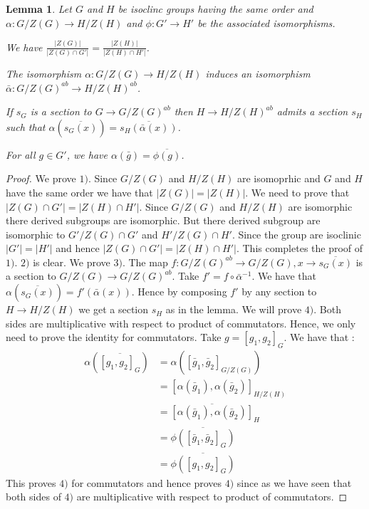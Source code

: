 \documentclass[12pt, reqno]{amsart}
\newtheorem{lemma}[theorem]{Lemma}
\begin{document}
\begin{lemma}
Let $G$ and $H$ be isoclinc groups having the same order and  $\alpha :G/Z(G)\to H/Z(H)$ and $\phi : G' \to H'$ be the associated isomorphisms.
\item[1)] We have $\frac{\vert Z(G) \vert}{\vert Z(G) \cap G' \vert}=\frac{\vert Z(H) \vert}{\vert Z(H) \cap H' \vert}$.
\item[2)] The isomorphism $\alpha :G/Z(G)\to H/Z(H)$ induces an isomorphism $\bar{\alpha} : G/Z(G)^{ab} \to H/Z(H)^{ab}$.
\item[3)] If $s_G$ is a section to $G \to  G/Z(G)^{ab}$ then $H\to  H/Z(H)^{ab}$ admits a section $s_H$ such that $\alpha(\overline{s_G(x)})=\overline{s_H(\bar{\alpha}(x))}$.
\item[4)] For all $g\in G'$, we have $\alpha(\bar{g})=\overline{\phi(g)}$.
\end{lemma}
\begin{proof}
We prove $1)$. Since $G/Z(G)$ and $H/Z(H)$ are isomoprhic and $G$ and $H$ have the same order we have that $\vert Z(G) \vert=\vert Z(H) \vert $. We need to prove that $\vert Z(G)\cap G'\vert =\vert Z(H) \cap H' \vert$. Since $G/Z(G)$ and $H/Z(H)$ are isomorphic there derived subgroups are isomorphic. But there derived subgroup are isomorphic to $G'/Z(G)\cap G'$ and $H'/Z(G)\cap H'$. Since the group are isoclinic $\vert G' \vert =\vert H'\vert$ and hence $\vert Z(G)\cap G'\vert =\vert Z(H) \cap H' \vert$. This completes the proof of $1)$. $2)$ is clear. We prove $3)$. The map $f:G/Z(G)^{ab}\to G/Z(G),x\to \overline{s_G(x)}$ is a section to $G/Z(G)\to G/Z(G)^{ab}$. Take $f'=f\circ \bar{\alpha}^{-1}$. We have that $\alpha(\overline{s_G(x)})=f'(\bar{\alpha}(x))$. Hence by composing $f'$ by any section to $H\to H/Z(H)$ we get a section $s_H$ as in the lemma. We will prove $4)$. Both sides are multiplicative with respect to product of commutators. Hence, we only need to prove the identity for commutators. Take $g=[g_1,g_2]_G$. We have that  : 
\begin{equation*}
\begin{split}
\alpha(\overline{[g_1,g_2]_G})&=\alpha([\bar{g}_1,\bar{g}_2]_{G/Z(G)}) \\
&=[\alpha(\bar{g}_1),\alpha(\bar{g}_2)]_{H/Z(H)} \\
&=\overline{[\alpha(\bar{g}_1),\alpha(\bar{g}_2)]}_H\\
&=\overline{\phi([\bar{g}_1,\bar{g}_2]_G)}\\
&=\overline{\phi([g_1,g_2]_G)}
\end{split}
\end{equation*}
This proves $4)$ for commutators and hence proves $4)$ since as we have seen that both sides of $4)$ are multiplicative with respect to product of commutators.
\end{proof}
\end{document}
